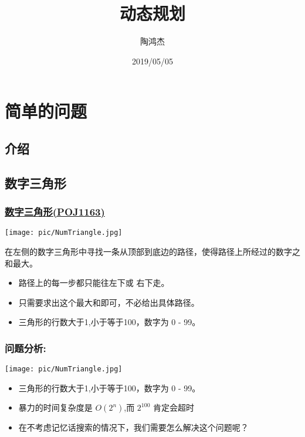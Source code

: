 \documentclass{beamer}
\title{动态规划}
\author{陶鸿杰}
\institute{QQ:1170755856}
\date{2019/05/05}
\begin{document}
\section{简单的问题}
\subsection{介绍}
\frame{\titlepage}

\subsection{数字三角形}
\begin{frame}
\frametitle{\href{http://poj.org/problem?id=1163}{数字三角形(POJ1163)}}

\begin{minipage}[b]{0.30\linewidth}
	\texttt{[image: pic/NumTriangle.jpg]}
\end{minipage}
\hfill
\begin{minipage}[b]{0.55\linewidth}

	 在左侧的数字三角形中寻找一条从顶部到底边的路径，使得路径上所经过的数字之和最大。\\ 
	 
	    \begin{itemize}
	 	\item 路径上的每一步都只能往左下或 右下走。
	 	\item 只需要求出这个最大和即可，不必给出具体路径。
	 	\item 三角形的行数大于1,小于等于100，数字为 0 - 99。
	 \end{itemize}
\end{minipage}
\end{frame}

\begin{frame}[fragile]
\frametitle{问题分析:}

\begin{minipage}[b]{0.30\linewidth}
	\texttt{[image: pic/NumTriangle.jpg]}
\end{minipage}
\hfill
\begin{minipage}[b]{0.55\linewidth}
	\begin{itemize}
		\item 三角形的行数大于1,小于等于100，数字为 0 - 99。
		\item 暴力的时间复杂度是 $O(2^n)$,而 $2^{100}$ 肯定会超时
		\item 在不考虑记忆话搜索的情况下，我们需要怎么解决这个问题呢？
		
	\end{itemize}
	
\end{minipage}
\end{frame}
\end{document}
